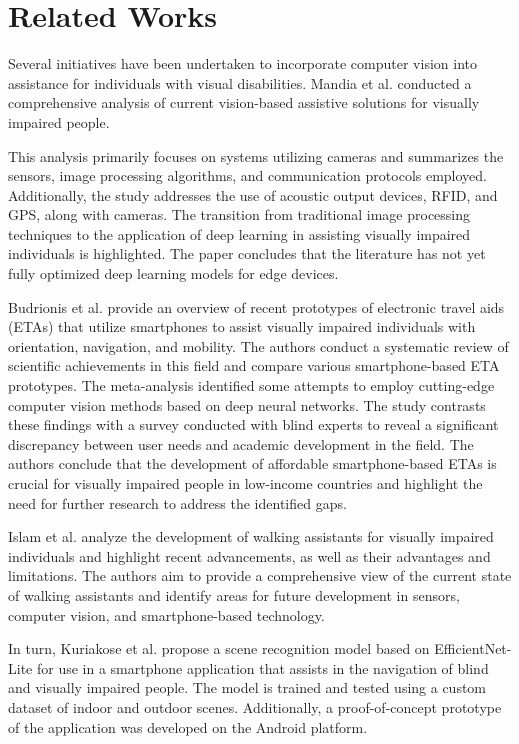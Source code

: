 \documentclass[final,5p,times,twocolumn]{elsarticle}
\begin{document}
\section{Related Works}\label{sec:works}

Several initiatives have been undertaken to incorporate computer vision into assistance for individuals with visual disabilities. Mandia et al. \cite{mandia2023} conducted a comprehensive analysis of current vision-based assistive solutions for visually impaired people.

This analysis primarily focuses on systems utilizing cameras and summarizes the sensors, image processing algorithms, and communication protocols employed. Additionally, the study addresses the use of acoustic output devices, RFID, and GPS, along with cameras. The transition from traditional image processing techniques to the application of deep learning in assisting visually impaired individuals is highlighted. The paper concludes that the literature has not yet fully optimized deep learning models for edge devices.

Budrionis et al. \cite{budrionis2022} provide an overview of recent prototypes of electronic travel aids (ETAs) that utilize smartphones to assist visually impaired individuals with orientation, navigation, and mobility. The authors conduct a systematic review of scientific achievements in this field and compare various smartphone-based ETA prototypes. The meta-analysis identified some attempts to employ cutting-edge computer vision methods based on deep neural networks. The study contrasts these findings with a survey conducted with blind experts to reveal a significant discrepancy between user needs and academic development in the field. The authors conclude that the development of affordable smartphone-based ETAs is crucial for visually impaired people in low-income countries and highlight the need for further research to address the identified gaps.

Islam et al. \cite{islam2019} analyze the development of walking assistants for visually impaired individuals and highlight recent advancements, as well as their advantages and limitations. The authors aim to provide a comprehensive view of the current state of walking assistants and identify areas for future development in sensors, computer vision, and smartphone-based technology.

In turn, Kuriakose et al. \cite{kuriakose2021} propose a scene recognition model based on EfficientNet-Lite for use in a smartphone application that assists in the navigation of blind and visually impaired people. The model is trained and tested using a custom dataset of indoor and outdoor scenes. Additionally, a proof-of-concept prototype of the application was developed on the Android platform.
\end{document}
